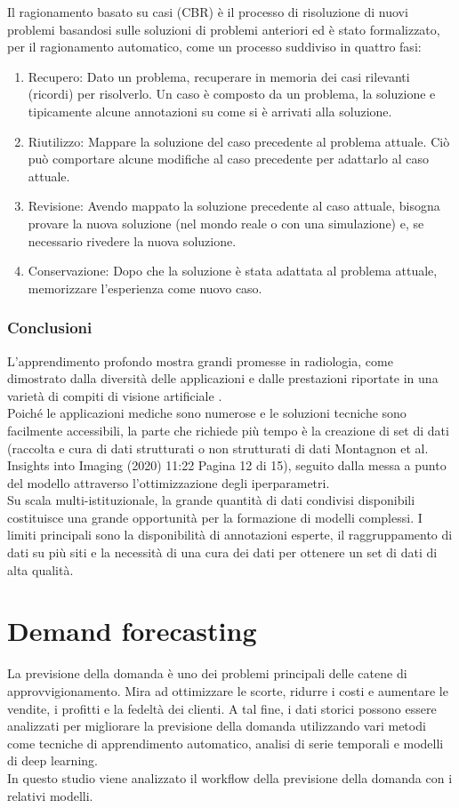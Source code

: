 \documentclass[12pt,a4paper]{report}
\begin{document}
Il ragionamento basato su casi (CBR) è il processo di risoluzione di nuovi problemi basandosi sulle soluzioni di problemi anteriori ed è stato formalizzato, per il ragionamento automatico, come un processo suddiviso in quattro fasi:
\begin{enumerate}
\item Recupero: Dato un problema, recuperare in memoria dei casi rilevanti (ricordi) per risolverlo. Un caso è composto da un problema, la soluzione e tipicamente alcune annotazioni su come si è arrivati alla soluzione.
\item Riutilizzo: Mappare la soluzione del caso precedente al problema attuale. Ciò può comportare alcune modifiche al caso precedente per adattarlo al caso attuale.
\item Revisione: Avendo mappato la soluzione precedente al caso attuale, bisogna provare la nuova soluzione (nel mondo reale o con una simulazione) e, se necessario rivedere la nuova soluzione.
\item Conservazione: Dopo che la soluzione è stata adattata al problema attuale, memorizzare l'esperienza come nuovo caso.
\end{enumerate}

\subsection{Conclusioni}
L'apprendimento profondo mostra grandi promesse in radiologia, come dimostrato dalla diversità delle applicazioni e dalle prestazioni riportate in una varietà di compiti di visione artificiale \cite{montagnon2020deep}.\\
Poiché le applicazioni mediche sono numerose e le soluzioni tecniche sono facilmente accessibili, la parte che richiede più tempo è la creazione di set di dati (raccolta e cura di dati strutturati o non strutturati di dati Montagnon et al. Insights into Imaging (2020) 11:22 Pagina 12 di 15), seguito dalla messa a punto del modello attraverso l'ottimizzazione degli iperparametri.\\
Su scala multi-istituzionale, la grande quantità di dati condivisi disponibili costituisce una grande opportunità per la formazione di modelli complessi. I limiti principali sono la disponibilità di annotazioni esperte, il raggruppamento di dati su più siti e la necessità di una cura dei dati per ottenere un set di dati di alta qualità. 


\chapter{Demand forecasting}
La previsione della domanda è uno dei problemi principali delle catene di approvvigionamento. Mira ad ottimizzare le scorte, ridurre i costi e aumentare le vendite, i profitti e la fedeltà dei clienti. A tal fine, i dati storici possono essere analizzati per migliorare la previsione della domanda utilizzando vari metodi come tecniche di apprendimento automatico, analisi di serie temporali e modelli di deep learning.\\
In questo studio viene analizzato il workflow della previsione della domanda con i relativi modelli. 
\end{document}
